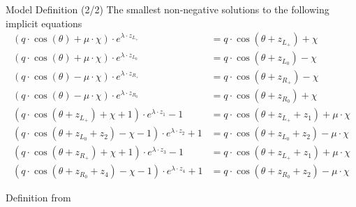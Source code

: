 \begin{frame}{Model Definition (2/2)}
	\vspace{-1em}
	The smallest non-negative solutions to the following implicit equations
	\begin{subequations}
		\begin{align}
			(q \cdot \cos(\theta) + \mu \cdot \chi) \cdot e^{\lambda \cdot z_{L_+}}
			 & = q \cdot \cos(\theta + z_{L_+}) + \chi \label{equ:setup.og.def.impl.1.A}                  \\
			(q \cdot \cos(\theta) + \mu \cdot \chi) \cdot e^{\lambda \cdot z_{L_0}}
			 & = q \cdot \cos(\theta + z_{L_0}) - \chi                                                    \\
			(q \cdot \cos(\theta) - \mu \cdot \chi) \cdot e^{\lambda \cdot z_{R_+}}
			 & = q \cdot \cos(\theta + z_{R_+}) - \chi                                                    \\
			(q \cdot \cos(\theta) - \mu \cdot \chi) \cdot e^{\lambda \cdot z_{R_0}}
			 & = q \cdot \cos(\theta + z_{R_0}) + \chi \label{equ:setup.og.def.impl.1.D}
			\\
			(q \cdot \cos(\theta + z_{L_+}) + \chi + 1) \cdot e^{\lambda \cdot z_1} - 1
			 & = q \cdot  \cos(\theta + z_{L_+} + z_1) + \mu \cdot \chi \label{equ:setup.og.def.impl.2.A} \\
			(q \cdot \cos(\theta + z_{L_0} + z_2) - \chi - 1) \cdot e^{\lambda \cdot z_2} + 1
			 & = q \cdot  \cos(\theta + z_{L_0} + z_2) - \mu \cdot \chi                                   \\
			(q \cdot \cos(\theta + z_{R_+}) + \chi + 1) \cdot e^{\lambda \cdot z_3} - 1
			 & = q \cdot  \cos(\theta + z_{L_+} + z_1) + \mu \cdot \chi                                   \\
			(q \cdot \cos(\theta + z_{R_0} + z_4) - \chi - 1) \cdot e^{\lambda \cdot z_4} + 1
			 & = q \cdot  \cos(\theta + z_{R_0} + z_2) - \mu \cdot \chi \label{equ:setup.og.def.impl.2.D}
		\end{align}
	\end{subequations}
	\begin{flushright}
		Definition from \cite{akyuz2022}
	\end{flushright}
\end{frame}

